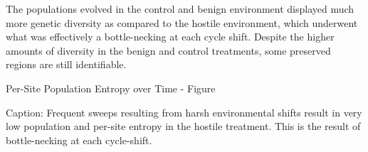 The populations evolved in the control and benign environment displayed much more genetic diversity as compared to the hostile environment, which underwent what was effectively a bottle-necking at each cycle shift. Despite the higher amounts of diversity in the benign and control treatments, some preserved regions are still identifiable.

Per-Site Population Entropy over Time - Figure

Caption: Frequent sweeps resulting from harsh environmental shifts result in very low population and per-site entropy in the hostile treatment. This is the result of bottle-necking at each cycle-shift.